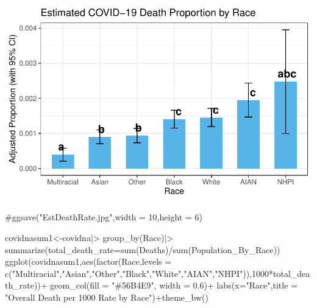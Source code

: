 \documentclass[
  letterpaper,
  DIV=11,
  numbers=noendperiod]{scrartcl}
\newenvironment{Shaded}{\begin{snugshade}}{\end{snugshade}}
\newcommand{\AttributeTok}[1]{\textcolor[rgb]{0.40,0.45,0.13}{#1}}
\newcommand{\CommentTok}[1]{\textcolor[rgb]{0.37,0.37,0.37}{#1}}
\newcommand{\DecValTok}[1]{\textcolor[rgb]{0.68,0.00,0.00}{#1}}
\newcommand{\FloatTok}[1]{\textcolor[rgb]{0.68,0.00,0.00}{#1}}
\newcommand{\FunctionTok}[1]{\textcolor[rgb]{0.28,0.35,0.67}{#1}}
\newcommand{\NormalTok}[1]{\textcolor[rgb]{0.00,0.23,0.31}{#1}}
\newcommand{\OtherTok}[1]{\textcolor[rgb]{0.00,0.23,0.31}{#1}}
\newcommand{\SpecialCharTok}[1]{\textcolor[rgb]{0.37,0.37,0.37}{#1}}
\newcommand{\StringTok}[1]{\textcolor[rgb]{0.13,0.47,0.30}{#1}}
\begin{document}
\includegraphics{StatsForFinalCSV_files/figure-pdf/unnamed-chunk-9-1.pdf}

\begin{Shaded}
\begin{Highlighting}[]
\CommentTok{\#ggsave("EstDeathRate.jpg",width = 10,height = 6)}

\NormalTok{covidnasum1}\OtherTok{\textless{}{-}}\NormalTok{covidna}\SpecialCharTok{|\textgreater{}}
  \FunctionTok{group\_by}\NormalTok{(Race)}\SpecialCharTok{|\textgreater{}}
  \FunctionTok{summarize}\NormalTok{(}\AttributeTok{total\_death\_rate=}\FunctionTok{sum}\NormalTok{(Deaths)}\SpecialCharTok{/}\FunctionTok{sum}\NormalTok{(Population\_By\_Race))}
\FunctionTok{ggplot}\NormalTok{(covidnasum1,}\FunctionTok{aes}\NormalTok{(}\FunctionTok{factor}\NormalTok{(Race,}\AttributeTok{levels =} \FunctionTok{c}\NormalTok{(}\StringTok{"Multiracial"}\NormalTok{,}\StringTok{"Asian"}\NormalTok{,}\StringTok{"Other"}\NormalTok{,}\StringTok{"Black"}\NormalTok{,}\StringTok{"White"}\NormalTok{,}\StringTok{"AIAN"}\NormalTok{,}\StringTok{"NHPI"}\NormalTok{)),}\DecValTok{1000}\SpecialCharTok{*}\NormalTok{total\_death\_rate))}\SpecialCharTok{+}
  \FunctionTok{geom\_col}\NormalTok{(}\AttributeTok{fill =} \StringTok{"\#56B4E9"}\NormalTok{, }\AttributeTok{width =} \FloatTok{0.6}\NormalTok{)}\SpecialCharTok{+}
  \FunctionTok{labs}\NormalTok{(}\AttributeTok{x=}\StringTok{"Race"}\NormalTok{,}\AttributeTok{title =} \StringTok{"Overall Death per 1000 Rate by Race"}\NormalTok{)}\SpecialCharTok{+}\FunctionTok{theme\_bw}\NormalTok{()}
\end{Highlighting}
\end{Shaded}
\end{document}
